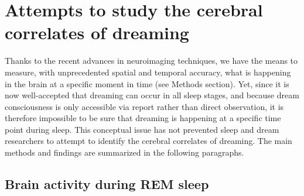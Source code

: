 \section{Attempts to study the cerebral correlates of dreaming}
\label{sec:dream-research:attempts}

Thanks to the recent advances in neuroimaging techniques, we have the means to measure, with unprecedented spatial and temporal accuracy, what is happening in the brain at a specific moment in time (see Methods section). Yet, since it is now well-accepted that dreaming can occur in all sleep stages, and because dream consciousness is only accessible via report rather than direct observation, it is therefore impossible to be sure that dreaming is happening at a specific time point during sleep. This conceptual issue has not prevented sleep and dream researchers to attempt to identify the cerebral correlates of dreaming. The main methods and findings are summarized in the following paragraphs.

\subsection{Brain activity during REM sleep}
\label{sec:dream-research:attempts:ba-rem}


